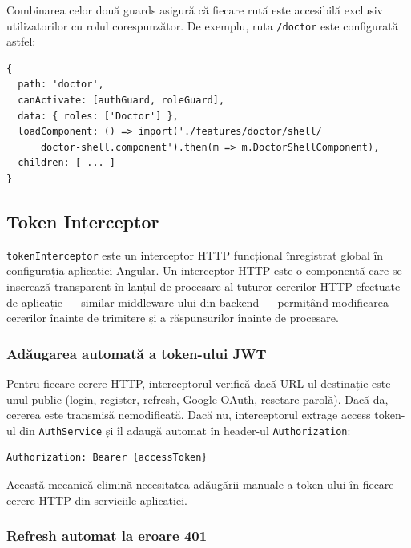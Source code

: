 \documentclass[12pt, a4paper]{report}
\begin{document}
Combinarea celor două guards asigură că fiecare rută este accesibilă exclusiv
utilizatorilor cu rolul corespunzător. De exemplu, ruta \texttt{/doctor} este
configurată astfel:

\begin{verbatim}
{
  path: 'doctor',
  canActivate: [authGuard, roleGuard],
  data: { roles: ['Doctor'] },
  loadComponent: () => import('./features/doctor/shell/
      doctor-shell.component').then(m => m.DoctorShellComponent),
  children: [ ... ]
}
\end{verbatim}


\subsection{Token Interceptor}

\texttt{tokenInterceptor} este un interceptor HTTP funcțional înregistrat global
în configurația aplicației Angular. Un interceptor HTTP este o componentă care se
inserează transparent în lanțul de procesare al tuturor cererilor HTTP efectuate
de aplicație --- similar middleware-ului din backend --- permițând modificarea
cererilor înainte de trimitere și a răspunsurilor înainte de procesare.

\subsubsection{Adăugarea automată a token-ului JWT}

Pentru fiecare cerere HTTP, interceptorul verifică dacă URL-ul destinație este
unul public (login, register, refresh, Google OAuth, resetare parolă). Dacă da,
cererea este transmisă nemodificată. Dacă nu, interceptorul extrage access token-ul
din \texttt{AuthService} și îl adaugă automat în header-ul \texttt{Authorization}:

\begin{verbatim}
Authorization: Bearer {accessToken}
\end{verbatim}

Această mecanică elimină necesitatea adăugării manuale a token-ului în fiecare
cerere HTTP din serviciile aplicației.

\subsubsection{Refresh automat la eroare 401}
\end{document}
